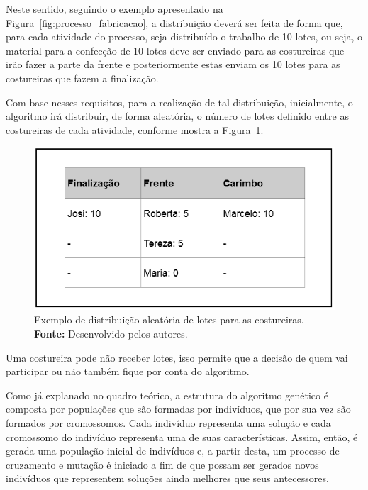 \par Neste sentido, seguindo o exemplo apresentado  na Figura~\ref{fig:processo_fabricacao}, a distribuição deverá ser feita de forma que, para cada atividade do processo, seja 
distribuído o trabalho de 10 lotes, ou seja, o material para a confecção de 10 lotes deve ser enviado para as costureiras
que irão fazer a parte da frente e posteriormente estas enviam os 10 lotes para as costureiras que fazem a finalização.

\par Com base nesses requisitos, para a realização de tal distribuição, inicialmente, o algoritmo irá distribuir, 
de forma aleatória, o número de lotes definido entre as costureiras de cada atividade,
conforme mostra a Figura~\ref{fig:distribuicao_lotes_costureiras}.



\begin{figure}[h!]
	\centerline{\includegraphics[scale=0.5]{./imagens/distribuicao_exemplo.png}}
	\caption[Exemplo de distribuição aleatória de lotes para as costureiras.]
	{Exemplo de distribuição aleatória de lotes para as costureiras.
	\textbf{Fonte:} Desenvolvido pelos autores.}
	\label{fig:distribuicao_lotes_costureiras}
\end{figure}

\par Uma costureira pode não receber lotes, isso permite que a decisão de
quem vai participar ou não também fique por conta do algoritmo.

\par Como já explanado no quadro teórico, a estrutura do algoritmo genético é composta
por populações que são formadas por indivíduos, que por sua vez são formados por cromossomos.
Cada indivíduo representa uma solução e cada cromossomo do indivíduo representa uma de suas características. 
Assim, então, é gerada uma população inicial de indivíduos e, a partir desta, um
processo de cruzamento e mutação é iniciado a fim de que possam ser gerados
novos indivíduos que representem soluções ainda melhores que seus antecessores.

